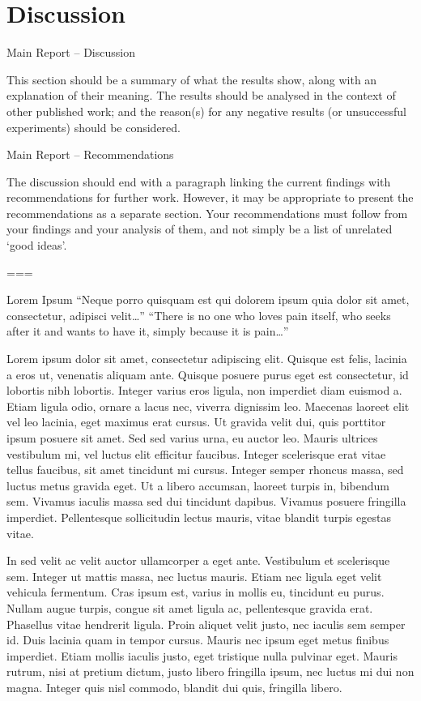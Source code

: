 \documentclass[
  11pt,
  a4paper,
]{scrreprt}
\begin{document}

\chapter{Discussion}\label{discussion}

Main Report -- Discussion

This section should be a summary of what the results show, along with an
explanation of their meaning. The results should be analysed in the
context of other published work; and the reason(s) for any negative
results (or unsuccessful experiments) should be considered.

Main Report -- Recommendations

The discussion should end with a paragraph linking the current findings
with recommendations for further work. However, it may be appropriate to
present the recommendations as a separate section. Your recommendations
must follow from your findings and your analysis of them, and not simply
be a list of unrelated `good ideas'.

===

Lorem Ipsum ``Neque porro quisquam est qui dolorem ipsum quia dolor sit
amet, consectetur, adipisci velit\ldots{}'' ``There is no one who loves
pain itself, who seeks after it and wants to have it, simply because it
is pain\ldots{}''

Lorem ipsum dolor sit amet, consectetur adipiscing elit. Quisque est
felis, lacinia a eros ut, venenatis aliquam ante. Quisque posuere purus
eget est consectetur, id lobortis nibh lobortis. Integer varius eros
ligula, non imperdiet diam euismod a. Etiam ligula odio, ornare a lacus
nec, viverra dignissim leo. Maecenas laoreet elit vel leo lacinia, eget
maximus erat cursus. Ut gravida velit dui, quis porttitor ipsum posuere
sit amet. Sed sed varius urna, eu auctor leo. Mauris ultrices vestibulum
mi, vel luctus elit efficitur faucibus. Integer scelerisque erat vitae
tellus faucibus, sit amet tincidunt mi cursus. Integer semper rhoncus
massa, sed luctus metus gravida eget. Ut a libero accumsan, laoreet
turpis in, bibendum sem. Vivamus iaculis massa sed dui tincidunt
dapibus. Vivamus posuere fringilla imperdiet. Pellentesque sollicitudin
lectus mauris, vitae blandit turpis egestas vitae.

In sed velit ac velit auctor ullamcorper a eget ante. Vestibulum et
scelerisque sem. Integer ut mattis massa, nec luctus mauris. Etiam nec
ligula eget velit vehicula fermentum. Cras ipsum est, varius in mollis
eu, tincidunt eu purus. Nullam augue turpis, congue sit amet ligula ac,
pellentesque gravida erat. Phasellus vitae hendrerit ligula. Proin
aliquet velit justo, nec iaculis sem semper id. Duis lacinia quam in
tempor cursus. Mauris nec ipsum eget metus finibus imperdiet. Etiam
mollis iaculis justo, eget tristique nulla pulvinar eget. Mauris rutrum,
nisi at pretium dictum, justo libero fringilla ipsum, nec luctus mi dui
non magna. Integer quis nisl commodo, blandit dui quis, fringilla
libero.
\end{document}
